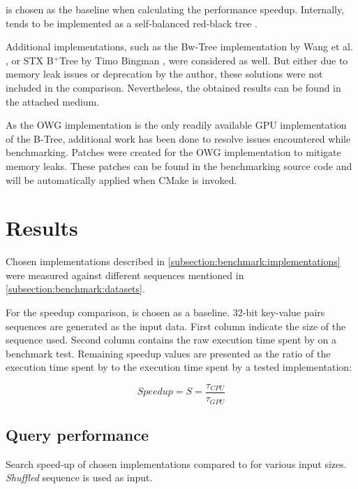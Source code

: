  is chosen as the baseline when calculating the performance speedup. Internally,  tends to be implemented as a self-balanced red-black tree \cite{cppreference-map}.

Additional implementations, such as the Bw-Tree implementation by Wang et al. \cite{bwtree-impl}, or STX B$^+$Tree by Timo Bingman \cite{stx-b+tree}, were considered as well. But either due to memory leak issues or deprecation by the author, these solutions were not included in the comparison. Nevertheless, the obtained results can be found in the attached medium.

As the OWG implementation is the only readily available GPU implementation of the B-Tree, additional work has been done to resolve issues encountered while benchmarking. Patches were created for the OWG implementation to mitigate memory leaks. These patches can be found in the benchmarking source code and will be automatically applied when CMake is invoked.

\section{Results}\label{section:results}

Chosen implementations described in \cref{subsection:benchmark:implementations} were measured against different sequences mentioned in \cref{subsection:benchmark:datasets}.

For the speedup comparison,  is chosen as a baseline. 32-bit key-value pairs sequences are generated as the input data. First column indicate the size of the sequence used. Second column contains the raw execution time spent by  on a benchmark test. Remaining speedup values are presented as the ratio of the execution time spent by  to the execution time spent by a tested implementation:

$$\mathit{Speedup} = S = \frac{\tau_{\mathit{CPU}}}{\tau_{\mathit{GPU}}}$$

\subsection{Query performance}
\begin{table}
  \centering
  
  \caption[Search speed-up compared to , shuffled sequence.]{Search speed-up of chosen implementations compared to  for various input sizes. \textit{Shuffled} sequence is used as input.}
  \label{table:query-shuffle}
\end{table}

